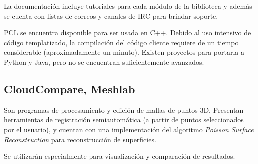 	La documentación incluye tutoriales para cada módulo de la biblioteca y
	además se cuenta con listas de correos y canales de IRC para brindar
	soporte.

	PCL se encuentra disponible para ser usada en C++.
	Debido al uso intensivo de código templatizado, la compilación del
	código cliente requiere de un tiempo considerable (aproximadamente un minuto).
	Existen proyectos para portarla a Python y Java, pero no se encuentran
	suficientemente avanzados.





	\subsection{CloudCompare, Meshlab}
	Son programas de procesamiento y edición de mallas de puntos 3D.  Presentan
	herramientas de registración semiautomática (a partir de puntos
	seleccionados por el usuario), y cuentan con una implementación del
	algoritmo \emph{Poisson Surface Reconstruction} para reconstrucción de
	superficies.

	Se utilizarán especialmente para visualización y comparación de resultados.

